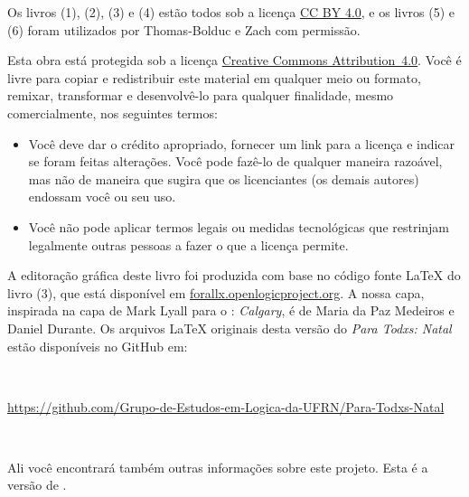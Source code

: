 Os livros (1), (2), (3) e (4) estão todos sob a licença \href{https://creativecommons.org/licenses/by/4.0/}{CC BY 4.0}, e os livros (5) e (6) foram utilizados por Thomas-Bolduc e Zach com permissão.\label{cc4by}




Esta obra está protegida sob a licença \href{https://creativecommons.org/licenses/by/4.0/}{Creative Commons \hbox{Attribution 4.0}}. 
Você é livre para copiar e redistribuir este material em qualquer meio ou formato, remixar, transformar e desenvolvê-lo para qualquer finalidade, mesmo comercialmente, nos seguintes termos:
\begin{itemize}\label{cc4by}
\item Você deve dar o crédito apropriado, fornecer um link para a licença e indicar se foram feitas alterações. Você pode fazê-lo de qualquer maneira razoável, mas não de maneira que sugira que os licenciantes (os demais autores) endossam você ou seu uso.
\item Você não pode aplicar termos legais ou medidas tecnológicas que restrinjam legalmente outras pessoas a fazer o que a licença permite.
\end{itemize}

\noindent A editoração gráfica deste livro foi produzida com base no código fonte \LaTeX{} do livro (3),  que está disponível em \hbox{\href{https://forallx.openlogicproject.org}{forallx.openlogicproject.org}}.
A nossa capa, inspirada na capa de Mark Lyall para o \forallx: \textit{Calgary}, é de Maria da Paz Medeiros e Daniel Durante.
Os arquivos  \LaTeX{} originais desta versão do \textit{Para Todxs: Natal} estão disponíveis no GitHub em:

\

\hbox{{\footnotesize \url{https://github.com/Grupo-de-Estudos-em-Logica-da-UFRN/Para-Todxs-Natal}}} 

\

\noindent Ali você encontrará também outras informações sobre este projeto.
Esta é a versão de \mydate.




